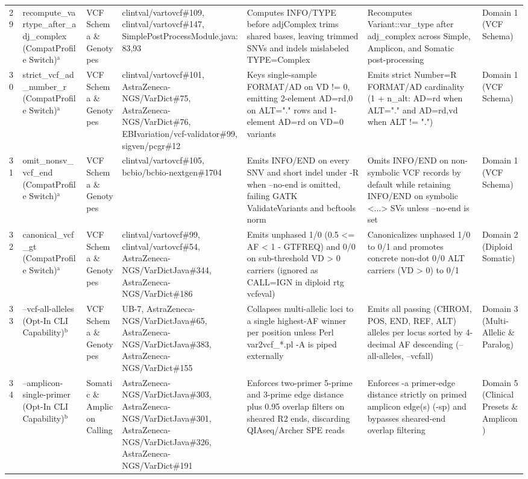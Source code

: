 \begin{table}[htbp]
{\begin{tabular}{lllllll}
29 & recompute\_vartype\_after\_adj\_complex (CompatProfile Switch)$^{\text{a}}$ & VCF Schema \& Genotypes & clintval/vartovcf\#109, clintval/vartovcf\#147, SimplePostProcessModule.java:83,93 & Computes INFO/TYPE before adjComplex trims shared bases, leaving trimmed SNVs and indels mislabeled TYPE=Complex & Recomputes Variant::var\_type after adj\_complex across Simple, Amplicon, and Somatic post-processing & Domain 1 (VCF Schema) \\
30 & strict\_vcf\_ad\_number\_r (CompatProfile Switch)$^{\text{a}}$ & VCF Schema \& Genotypes & clintval/vartovcf\#101, AstraZeneca-NGS/VarDict\#75, AstraZeneca-NGS/VarDict\#76, EBIvariation/vcf-validator\#99, sigven/pcgr\#12 & Keys single-sample FORMAT/AD on VD != 0, emitting 2-element AD=rd,0 on ALT="." rows and 1-element AD=rd on VD=0 variants & Emits strict Number=R FORMAT/AD cardinality (1 + n\_alt: AD=rd when ALT="." and AD=rd,vd when ALT != ".") & Domain 1 (VCF Schema) \\
31 & omit\_nonsv\_vcf\_end (CompatProfile Switch)$^{\text{a}}$ & VCF Schema \& Genotypes & clintval/vartovcf\#105, bcbio/bcbio-nextgen\#1704 & Emits INFO/END on every SNV and short indel under -R when --no-end is omitted, failing GATK ValidateVariants and bcftools norm & Omits INFO/END on non-symbolic VCF records by default while retaining INFO/END on symbolic \textless{}...\textgreater{} SVs unless --no-end is set & Domain 1 (VCF Schema) \\
32 & canonical\_vcf\_gt (CompatProfile Switch)$^{\text{a}}$ & VCF Schema \& Genotypes & clintval/vartovcf\#99, clintval/vartovcf\#54, AstraZeneca-NGS/VarDictJava\#344, AstraZeneca-NGS/VarDict\#186 & Emits unphased 1/0 (0.5 \textless{}= AF \textless{} 1 - GTFREQ) and 0/0 on sub-threshold VD \textgreater{} 0 carriers (ignored as CALL=IGN in diploid rtg vcfeval) & Canonicalizes unphased 1/0 to 0/1 and promotes concrete non-dot 0/0 ALT carriers (VD \textgreater{} 0) to 0/1 & Domain 2 (Diploid Somatic) \\
33 & --vcf-all-alleles (Opt-In CLI Capability)$^{\text{b}}$ & VCF Schema \& Genotypes & UB-7, AstraZeneca-NGS/VarDictJava\#65, AstraZeneca-NGS/VarDictJava\#383, AstraZeneca-NGS/VarDict\#155 & Collapses multi-allelic loci to a single highest-AF winner per position unless Perl var2vcf\_*.pl -A is piped externally & Emits all passing (CHROM, POS, END, REF, ALT) alleles per locus sorted by 4-decimal AF descending (--all-alleles, --vcfall) & Domain 3 (Multi-Allelic \& Paralog) \\
34 & --amplicon-single-primer (Opt-In CLI Capability)$^{\text{b}}$ & Somatic \& Amplicon Calling & AstraZeneca-NGS/VarDictJava\#303, AstraZeneca-NGS/VarDictJava\#301, AstraZeneca-NGS/VarDictJava\#326, AstraZeneca-NGS/VarDict\#191 & Enforces two-primer 5-prime and 3-prime edge distance plus 0.95 overlap filters on sheared R2 ends, discarding QIAseq/Archer SPE reads & Enforces -a primer-edge distance strictly on primed amplicon edge(s) (-sp) and bypasses sheared-end overlap filtering & Domain 5 (Clinical Presets \& Amplicon) \\

\end{tabular}}
\end{table}
